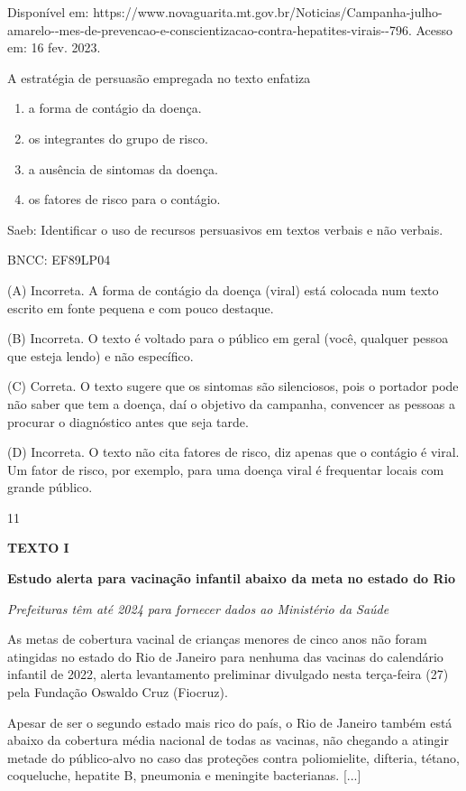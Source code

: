 Disponível em:
https://www.novaguarita.mt.gov.br/Noticias/Campanha-julho-amarelo-\/-mes-de-prevencao-e-conscientizacao-contra-hepatites-virais-\/-796.
Acesso em: 16 fev. 2023.

A estratégia de persuasão empregada no texto enfatiza

\begin{enumerate}
\def\labelenumi{\alph{enumi})}
\item
  a forma de contágio da doença.
\item
  os integrantes do grupo de risco.
\item
  a ausência de sintomas da doença.
\item
  os fatores de risco para o contágio.
\end{enumerate}

Saeb: Identificar o uso de recursos persuasivos em textos verbais e não
verbais.

BNCC: EF89LP04

(A) Incorreta. A forma de contágio da doença (viral) está colocada num
texto escrito em fonte pequena e com pouco destaque.

(B) Incorreta. O texto é voltado para o público em geral (você, qualquer
pessoa que esteja lendo) e não específico.

(C) Correta. O texto sugere que os sintomas são silenciosos, pois o
portador pode não saber que tem a doença, daí o objetivo da campanha,
convencer as pessoas a procurar o diagnóstico antes que seja tarde.

(D) Incorreta. O texto não cita fatores de risco, diz apenas que o
contágio é viral. Um fator de risco, por exemplo, para uma doença viral
é frequentar locais com grande público.

\num{11}

\textbf{TEXTO I}

\textbf{Estudo alerta para vacinação infantil abaixo da meta no estado
do Rio}

\emph{Prefeituras têm até 2024 para fornecer dados ao Ministério da
Saúde}

As metas de cobertura vacinal de crianças menores de cinco anos não
foram atingidas no estado do Rio de Janeiro para nenhuma das vacinas do
calendário infantil de 2022, alerta levantamento preliminar divulgado
nesta terça-feira (27) pela Fundação Oswaldo Cruz (Fiocruz).

Apesar de ser o segundo estado mais rico do país, o Rio de Janeiro
também está abaixo da cobertura média nacional de todas as vacinas, não
chegando a atingir metade do público-alvo no caso das proteções contra
poliomielite, difteria, tétano, coqueluche, hepatite B, pneumonia e
meningite bacterianas. {[}...{]}

